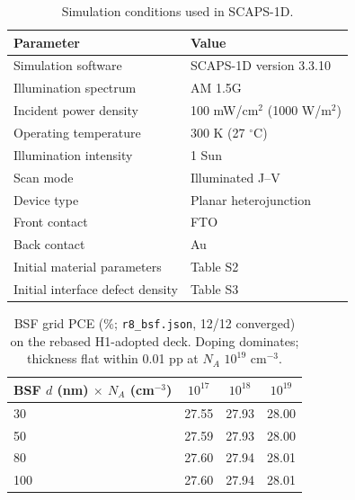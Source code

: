 \documentclass[11pt]{article}
\begin{document}
\begin{table}[htbp]
\centering
{\small\setlength{\tabcolsep}{3pt}
\begin{tabularx}{\textwidth}{XX}
\hline
Parameter & Value
\\\hline
Simulation software & SCAPS-1D version 3.3.10\\
Illumination spectrum & AM 1.5G\\
Incident power density & 100 mW/cm$^{2}$ (1000 W/m$^{2}$)\\
Operating temperature & 300 K (27 $^{\circ}$C)\\
Illumination intensity & 1 Sun\\
Scan mode & Illuminated J--V\\
Device type & Planar heterojunction\\
Front contact & FTO\\
Back contact & Au\\
Initial material parameters & Table S2\\
Initial interface defect density & Table S3\\
\hline
\end{tabularx}
}
\caption{Simulation conditions used in SCAPS-1D.}
\end{table}
\begin{table}[htbp]
\centering
{\small\setlength{\tabcolsep}{3pt}
\begin{tabularx}{\textwidth}{Xccc}
\hline
BSF $d$ (nm) $\times$ $N_{A}$ (cm$^{-3}$) & $10^{17}$ & $10^{18}$ & $10^{19}$\\
\hline
30 & 27.55 & 27.93 & 28.00\\
50 & 27.59 & 27.93 & 28.00\\
80 & 27.60 & 27.94 & 28.01\\
100 & 27.60 & 27.94 & 28.01\\
\hline
\end{tabularx}}
\caption{BSF grid PCE (\%; \texttt{r8\_bsf.json}, 12/12 converged) on the rebased H1-adopted deck. Doping dominates; thickness flat within 0.01 pp at $N_{A}$ $10^{19}$ cm$^{-3}$.}
\end{table}
\end{document}
